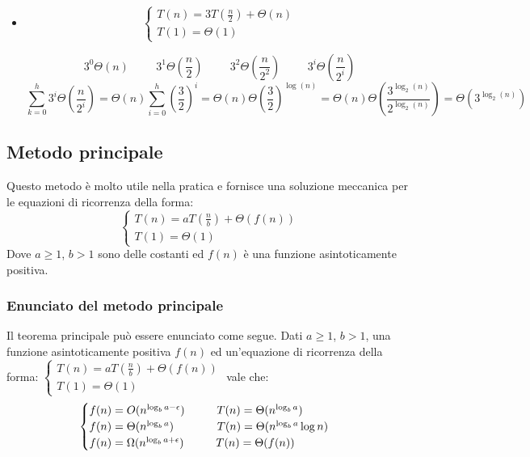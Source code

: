 \begin{example}
\begin{itemize}
        \item $$\begin{cases}T(n)=3T(\frac{n}{2})+\Theta(n)\\T(1)=\Theta(1)\end{cases}$$
            
        \begin{equation*}
            3^0 \Theta(n)\hspace{1cm}3^1 \Theta(\frac{n}{2})\hspace{1cm}3^2 \Theta(\frac{n}{2^2})\hspace{1cm}3^i \Theta(\frac{n}{2^i})
        \end{equation*}
        \begin{equation*}
            \sum^h_{k=0}3^i\Theta(\frac{n}{2^i})=\Theta(n)\sum^h_{i=0}(\frac{3}{2})^i=\Theta(n)\Theta(\frac{3}{2})^{\log(n)}=\Theta(n)\Theta(\frac{3^{\log_2(n)}}{2^{\log_2(n)}})=\Theta(3^{\log_2(n)})
        \end{equation*}
        
    \end{itemize}
\end{example}

\subsection*{Metodo principale}
Questo metodo è molto utile nella pratica e fornisce una soluzione meccanica per le equazioni di ricorrenza della forma:
$$\begin{cases}T(n) = aT(\frac{n}{b}) + \Theta(f(n))\\T(1) = \Theta(1)\end{cases}$$
Dove $a\geq1$, $b>1$ sono delle costanti ed $f(n)$ è una funzione asintoticamente positiva.

\subsubsection{Enunciato del metodo principale}
Il teorema principale può essere enunciato come segue. Dati $a\geq1$, $b > 1$, una funzione asintoticamente positiva $f(n)$ ed un’equazione di ricorrenza della forma:
$\begin{cases}T(n) = aT(\frac{n}{b}) + \Theta(f(n))\\T(1) = \Theta(1)\end{cases}$ vale che:
$$\begin{cases}
    f(n)=O(n^{\log_ba-\epsilon})\hspace{1cm}T(n)=\Theta(n^{\log_ba})\\
    f(n)=\Theta(n^{\log_ba})\hspace{1.35cm}T(n)=\Theta(n^{\log_ba}\log n)\\
    f(n)=\Omega(n^{\log_ba+\epsilon})\hspace{1cm}T(n)=\Theta(f(n))
\end{cases}$$

